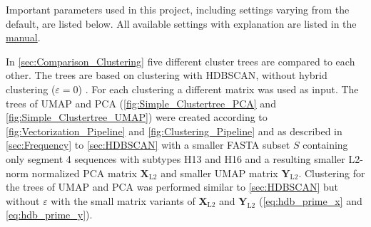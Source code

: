 Important parameters used in this project, including settings varying from the default, are listed below. All available settings with explanation are listed in the \href{https://mafft.cbrc.jp/alignment/software/}{manual}.

    
        
        
        

In \autoref{sec:Comparison_Clustering} five different cluster trees are compared to each other. The trees are based on clustering with \gls{HDBSCAN}, without hybrid clustering ($\varepsilon=0$) \autocite{malzer_hybrid_2020, mcinnes_hdbscan_2017}. For each clustering a different matrix was used as input. The trees of \gls{UMAP} and \gls{PCA} (\autoref{fig:Simple_Clustertree_PCA} and \autoref{fig:Simple_Clustertree_UMAP}) were created according to \autoref{fig:Vectorization_Pipeline} and \autoref{fig:Clustering_Pipeline} and as described in \autoref{sec:Frequency} to \autoref{sec:HDBSCAN} with a smaller FASTA subset $S$ containing only segment 4 sequences with subtypes H13 and H16 and a resulting smaller L2-norm normalized \gls{PCA} matrix $\mathbf{X}_{\text{L2}}$ and smaller \gls{UMAP} matrix $\mathbf{Y}_{\text{L2}}$. Clustering for the trees of \gls{UMAP} and \gls{PCA} was performed similar to \autoref{sec:HDBSCAN} but without $\varepsilon$ with the small matrix variants of $\mathbf{X}_{\text{L2}}$ and $\mathbf{Y}_{\text{L2}}$ (\autoref{eq:hdb_prime_x} and \autoref{eq:hdb_prime_y}). 


